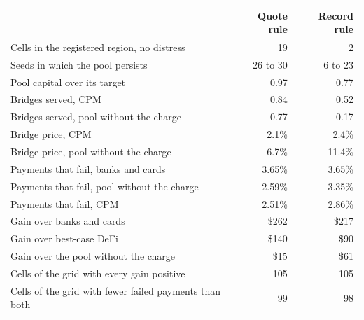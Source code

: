 \begin{tabular}{lrr}
\toprule
 & Quote rule & Record rule \\
\midrule
Cells in the registered region, no distress & 19 & 2 \\
Seeds in which the pool persists & 26 to 30 & 6 to 23 \\
Pool capital over its target & 0.97 & 0.77 \\
\midrule
Bridges served, CPM & 0.84 & 0.52 \\
Bridges served, pool without the charge & 0.77 & 0.17 \\
Bridge price, CPM & 2.1\% & 2.4\% \\
Bridge price, pool without the charge & 6.7\% & 11.4\% \\
Payments that fail, banks and cards & 3.65\% & 3.65\% \\
Payments that fail, pool without the charge & 2.59\% & 3.35\% \\
Payments that fail, CPM & 2.51\% & 2.86\% \\
Gain over banks and cards & \$262 & \$217 \\
Gain over best-case DeFi & \$140 & \$90 \\
Gain over the pool without the charge & \$15 & \$61 \\
\midrule
Cells of the grid with every gain positive & 105 & 105 \\
Cells of the grid with fewer failed payments than both & 99 & 98 \\
\bottomrule
\end{tabular}
